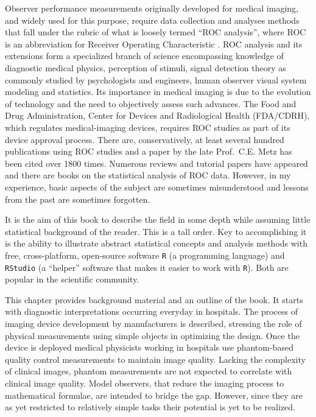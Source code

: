 \documentclass[
]{book}
\begin{document}
Observer performance measurements originally developed for medical imaging, and widely used for this purpose, require data collection and analyses methods that fall under the rubric of what is loosely termed ``ROC analysis'', where ROC is an abbreviation for Receiver Operating Characteristic \citep{metz1978rocmethodology}. ROC analysis and its extensions form a specialized branch of science encompassing knowledge of diagnostic medical physics, perception of stimuli, signal detection theory as commonly studied by psychologists and engineers, human observer visual system modeling and statistics. Its importance in medical imaging is due to the evolution of technology and the need to objectively assess such advances. The Food and Drug Administration, Center for Devices and Radiological Health (FDA/CDRH), which regulates medical-imaging devices, requires ROC studies as part of its device approval process. There are, conservatively, at least several hundred publications using ROC studies and a paper \citep{metz1978rocmethodology} by the late Prof.~C.E. Metz has been cited over 1800 times. Numerous reviews and tutorial papers have appeared \citep[\citet{metz1989some}, \citet{kundel2008receiver}, \citet{metz1986rocmethodology}]{metz1978rocmethodology} and there are books on the statistical analysis \citep{RN1443} of ROC data. However, in my experience, basic aspects of the subject are sometimes misunderstood and lessons from the past are sometimes forgotten.

It is the aim of this book to describe the field in some depth while assuming little statistical background of the reader. This is a tall order. Key to accomplishing it is the ability to illustrate abstract statistical concepts and analysis methods with free, cross-platform, open-source software \texttt{R} (a programming language) and \texttt{RStudio} (a ``helper'' software that makes it easier to work with \texttt{R}). Both are popular in the scientific community.

This chapter provides background material and an outline of the book. It starts with diagnostic interpretations occurring everyday in hospitals. The process of imaging device development by manufacturers is described, stressing the role of physical measurements using simple objects in optimizing the design. Once the device is deployed medical physicists working in hospitals use phantom-based quality control measurements to maintain image quality. Lacking the complexity of clinical images, phantom measurements are not expected to correlate with clinical image quality. Model observers, that reduce the imaging process to mathematical formulae, are intended to bridge the gap. However, since they are as yet restricted to relatively simple tasks their potential is yet to be realized.
\end{document}
